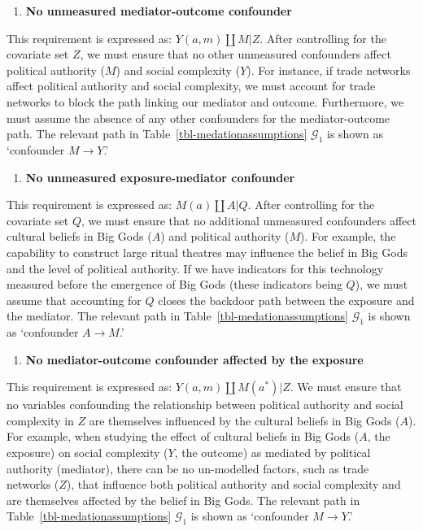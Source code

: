\documentclass[
  single column]{article}
\providecommand{\tightlist}{%
  \setlength{\itemsep}{0pt}\setlength{\parskip}{0pt}}\usepackage{longtable,booktabs,array}
\begin{document}
\begin{enumerate}
\def\labelenumi{\arabic{enumi}.}
\setcounter{enumi}{1}
\tightlist
\item
  \textbf{No unmeasured mediator-outcome confounder}
\end{enumerate}

This requirement is expressed as: \(Y(a,m) \coprod M | Z\). After
controlling for the covariate set \(Z\), we must ensure that no other
unmeasured confounders affect political authority (\(M\)) and social
complexity (\(Y\)). For instance, if trade networks affect political
authority and social complexity, we must account for trade networks to
block the path linking our mediator and outcome. Furthermore, we must
assume the absence of any other confounders for the mediator-outcome
path. The relevant path in Table~\ref{tbl-medationassumptions}
\(\mathcal{G}_1\) is shown as `confounder \(M \to Y\).'

\begin{enumerate}
\def\labelenumi{\arabic{enumi}.}
\setcounter{enumi}{2}
\tightlist
\item
  \textbf{No unmeasured exposure-mediator confounder}
\end{enumerate}

This requirement is expressed as: \(M(a) \coprod A | Q\). After
controlling for the covariate set \(Q\), we must ensure that no
additional unmeasured confounders affect cultural beliefs in Big Gods
(\(A\)) and political authority (\(M\)). For example, the capability to
construct large ritual theatres may influence the belief in Big Gods and
the level of political authority. If we have indicators for this
technology measured before the emergence of Big Gods (these indicators
being \(Q\)), we must assume that accounting for \(Q\) closes the
backdoor path between the exposure and the mediator. The relevant path
in Table~\ref{tbl-medationassumptions} \(\mathcal{G}_1\) is shown as
`confounder \(A \to M\).'

\begin{enumerate}
\def\labelenumi{\arabic{enumi}.}
\setcounter{enumi}{3}
\tightlist
\item
  \textbf{No mediator-outcome confounder affected by the exposure}
\end{enumerate}

This requirement is expressed as: \(Y(a,m) \coprod M(a^*) | Z\). We must
ensure that no variables confounding the relationship between political
authority and social complexity in \(Z\) are themselves influenced by
the cultural beliefs in Big Gods (\(A\)). For example, when studying the
effect of cultural beliefs in Big Gods (\(A\), the exposure) on social
complexity (\(Y\), the outcome) as mediated by political authority
(mediator), there can be no un-modelled factors, such as trade networks
(\(Z\)), that influence both political authority and social complexity
and are themselves affected by the belief in Big Gods. The relevant path
in Table~\ref{tbl-medationassumptions} \(\mathcal{G}_1\) is shown as
`confounder \(M \to Y\).'
\end{document}
